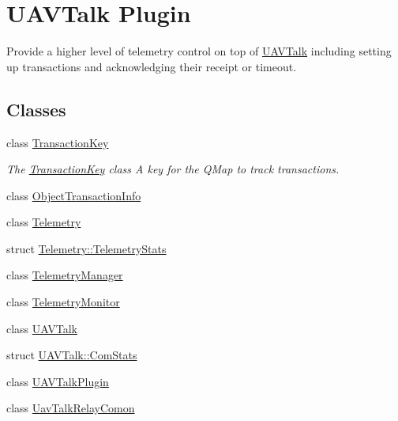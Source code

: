 \hypertarget{group___u_a_v_talk_plugin}{\section{U\-A\-V\-Talk Plugin}
\label{group___u_a_v_talk_plugin}
}


Provide a higher level of telemetry control on top of \hyperlink{class_u_a_v_talk}{U\-A\-V\-Talk} including setting up transactions and acknowledging their receipt or timeout.  


\subsection*{Classes}
\begin{DoxyCompactItemize}
\item 
class \hyperlink{class_transaction_key}{Transaction\-Key}
\begin{DoxyCompactList}\small\item\em The \hyperlink{class_transaction_key}{Transaction\-Key} class A key for the Q\-Map to track transactions. \end{DoxyCompactList}\item 
class \hyperlink{class_object_transaction_info}{Object\-Transaction\-Info}
\item 
class \hyperlink{class_telemetry}{Telemetry}
\item 
struct \hyperlink{struct_telemetry_1_1_telemetry_stats}{Telemetry\-::\-Telemetry\-Stats}
\item 
class \hyperlink{class_telemetry_manager}{Telemetry\-Manager}
\item 
class \hyperlink{class_telemetry_monitor}{Telemetry\-Monitor}
\item 
class \hyperlink{class_u_a_v_talk}{U\-A\-V\-Talk}
\item 
struct \hyperlink{struct_u_a_v_talk_1_1_com_stats}{U\-A\-V\-Talk\-::\-Com\-Stats}
\item 
class \hyperlink{class_u_a_v_talk_plugin}{U\-A\-V\-Talk\-Plugin}
\item 
class \hyperlink{class_uav_talk_relay_comon}{Uav\-Talk\-Relay\-Comon}
\end{DoxyCompactItemize}
